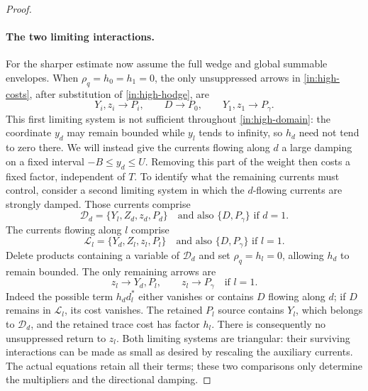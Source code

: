 \begin{proof}
\paragraph{The two limiting interactions.}
For the sharper estimate now assume the full wedge and global
summable envelopes. When $\rho_q=h_0=h_1=0$, the only unsuppressed
arrows in \eqref{in:high-costs}, after substitution of
\eqref{in:high-hodge}, are
\[
 Y_i,z_i\longrightarrow P_i,\qquad
 D\longrightarrow P_0,\qquad Y_1,z_1\longrightarrow P_\gamma.
\]
This first limiting system is not sufficient throughout
\eqref{in:high-domain}: the coordinate $y_d$ may remain bounded
while $y_l$ tends to infinity, so $h_d$ need not tend to zero there.
We will instead give the currents flowing along $d$ a large damping
on a fixed interval $-B\le y_d\le U$. Removing this part of the
weight then costs a fixed factor, independent of $T$. To identify
what the remaining currents must control, consider a second limiting
system in which the $d$-flowing currents are strongly damped.
Those currents comprise
\[
 \mathcal D_d=\{Y_l,Z_d,z_d,P_d\}
   \quad\text{and also }\{D,P_\gamma\}\text{ if }d=1.
\]
The currents flowing along $l$ comprise
\[
 \mathcal L_l=\{Y_d,Z_l,z_l,P_l\}
   \quad\text{and also }\{D,P_\gamma\}\text{ if }l=1.
\]
Delete products containing a variable of $\mathcal D_d$ and set
$\rho_q=h_l=0$, allowing $h_d$ to remain bounded. The only
remaining arrows are
\begin{equation}\label{in:asymmetric-arrows}
 z_l\longrightarrow Y_d,P_l,
 \qquad z_l\longrightarrow P_\gamma\quad\text{if }l=1.
\end{equation}
Indeed the possible term $h_dd_l^*$ either vanishes or contains
$D$ flowing along $d$; if $D$ remains in $\mathcal L_l$, its cost
vanishes. The retained $P_l$ source contains $Y_l$, which belongs
to $\mathcal D_d$, and the retained trace cost has factor $h_l$.
There is consequently no unsuppressed return to $z_l$.
Both limiting systems are triangular: their surviving interactions
can be made as small as desired by rescaling the auxiliary currents.
The actual equations retain all their terms; these two comparisons
only determine the multipliers and the directional damping.


\end{proof}
